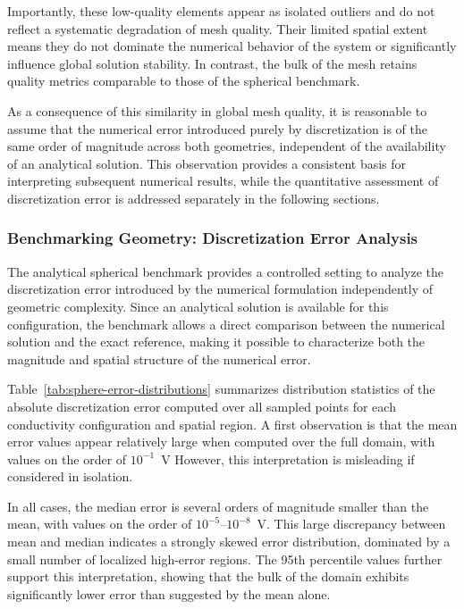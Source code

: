 \documentclass[../00_Main.tex]{subfiles}
\begin{document}
Importantly, these low-quality elements appear as isolated outliers and do not reflect a systematic degradation of mesh quality. Their limited spatial extent means they do not dominate the numerical behavior of the system or significantly influence global solution stability. In contrast, the bulk of the mesh retains quality metrics comparable to those of the spherical benchmark.

As a consequence of this similarity in global mesh quality, it is reasonable to assume that the numerical error introduced purely by discretization is of the same order of magnitude across both geometries, independent of the availability of an analytical solution. This observation provides a consistent basis for interpreting subsequent numerical results, while the quantitative assessment of discretization error is addressed separately in the following sections.


\subsubsection{Benchmarking Geometry: Discretization Error Analysis}

The analytical spherical benchmark provides a controlled setting to analyze the discretization error introduced by the numerical formulation independently of geometric complexity. Since an analytical solution is available for this configuration, the benchmark allows a direct comparison between the numerical solution and the exact reference, making it possible to characterize both the magnitude and spatial structure of the numerical error.


Table~\ref{tab:sphere-error-distributions} summarizes distribution statistics of the absolute discretization error computed over all sampled points for each conductivity configuration and spatial region. A first observation is that the mean error values appear relatively large when computed over the full domain, with values on the order of $10^{-1}$~V However, this interpretation is misleading if considered in isolation.

In all cases, the median error is several orders of magnitude smaller than the mean, with values on the order of $10^{-5}$--$10^{-8}$~V. This large discrepancy between mean and median indicates a strongly skewed error distribution, dominated by a small number of localized high-error regions. The 95th percentile values further support this interpretation, showing that the bulk of the domain exhibits significantly lower error than suggested by the mean alone.
\end{document}
